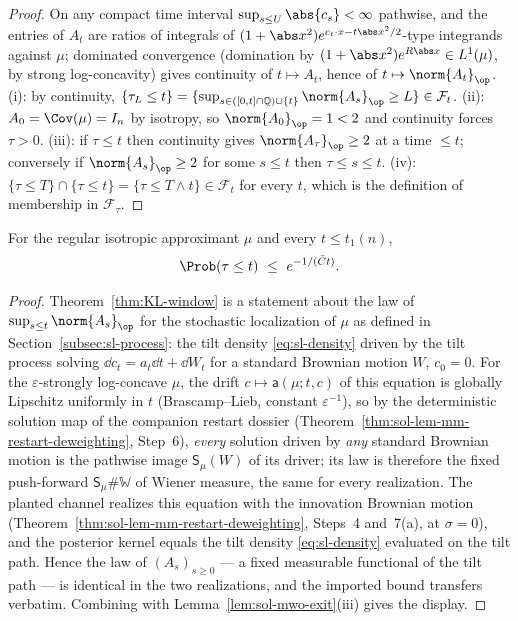 \documentclass[../main.tex]{subfiles}
\begin{document}
\begin{proof}
On any compact time interval $\sup_{s\le U}\abs{c_s}<\infty$ pathwise, and the entries
of $A_t$ are ratios of integrals of $(1+\abs x^2)e^{c_t\cdot x-t\abs x^2/2}$-type
integrands against $\mu$; dominated convergence (domination by
$(1+\abs x^2)e^{R\abs x}\in L^1(\mu)$, by strong log-concavity) gives continuity of
$t\mapsto A_t$, hence of $t\mapsto\norm{A_t}_\op$.  (i): by continuity,
$\{\tau_L\le t\}=\{\sup_{s\in([0,t]\cap\mathbb Q)\cup\{t\}}\norm{A_s}_\op\ge L\}
\in\mathcal F_t$.  (ii): $A_0=\Cov(\mu)=I_n$ by isotropy, so $\norm{A_0}_\op=1<2$ and
continuity forces $\tau>0$.  (iii): if $\tau\le t$ then continuity gives
$\norm{A_\tau}_\op\ge2$ at a time $\le t$; conversely if $\norm{A_s}_\op\ge2$ for some
$s\le t$ then $\tau\le s\le t$.  (iv): $\{\tau\le T\}\cap\{\tau\le t\}
=\{\tau\le T\wedge t\}\in\mathcal F_{t}$ for every $t$, which is the definition of
membership in $\mathcal F_\tau$.
\end{proof}

\begin{lemma}
\label{lem:sol-mwo-law}
For the regular isotropic approximant $\mu$ and every $t\le t_1(n)$,
\[
  \Prob(\tau\le t)\ \le\ e^{-1/(\bar Ct)} .
\]
\end{lemma}

\begin{proof}
Theorem~\ref{thm:KL-window} is a statement about the law of
$\sup_{s\le t}\norm{A_s}_\op$ for the stochastic localization of $\mu$ as defined in
Section~\ref{subsec:sl-process}: the tilt density \eqref{eq:sl-density} driven by the
tilt process solving $\dd c_t=a_t\dd t+\dd W_t$ for a standard Brownian motion $W$,
$c_0=0$.  For the $\varepsilon$-strongly log-concave $\mu$, the drift
$c\mapsto\mathsf a(\mu;t,c)$ of this equation is globally Lipschitz uniformly in $t$
(Brascamp--Lieb, constant $\varepsilon^{-1}$), so by the deterministic solution map of
the companion restart dossier (Theorem~\ref{thm:sol-lem-mm-restart-deweighting},
Step~6), \emph{every} solution driven by \emph{any} standard Brownian motion is the
pathwise image $\mathsf S_\mu(W)$ of its driver; its law is therefore the fixed
push-forward $\mathsf S_\mu\#\mathbb W$ of Wiener measure, the same for every
realization.  The planted channel realizes this equation with the innovation Brownian
motion (Theorem~\ref{thm:sol-lem-mm-restart-deweighting}, Steps~4 and~7(a), at
$\sigma=0$), and the posterior kernel equals the tilt density
\eqref{eq:sl-density} evaluated on the tilt path.  Hence the law of
$(A_s)_{s\ge0}$ --- a fixed measurable functional of the tilt path --- is identical in
the two realizations, and the imported bound transfers verbatim.  Combining with
Lemma~\ref{lem:sol-mwo-exit}(iii) gives the display.
\end{proof}
\end{document}
